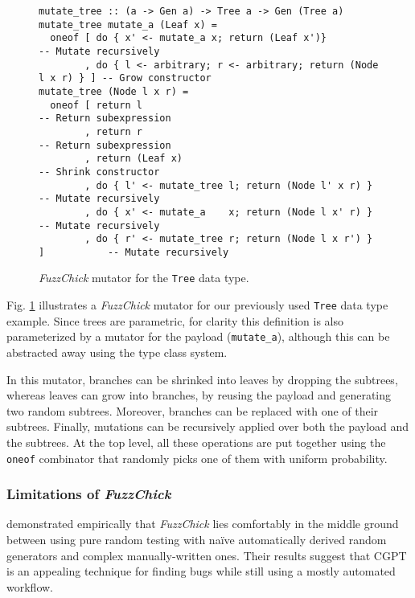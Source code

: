 \documentclass[acmsmall, anonymous]{acmart}
\newcommand{\fuzzchick}{\textit{FuzzChick}\xspace}
\begin{document}
\begin{figure}
\begin{verbatim}
mutate_tree :: (a -> Gen a) -> Tree a -> Gen (Tree a)
mutate_tree mutate_a (Leaf x) =
  oneof [ do { x' <- mutate_a x; return (Leaf x')}                     -- Mutate recursively
        , do { l <- arbitrary; r <- arbitrary; return (Node l x r) } ] -- Grow constructor
mutate_tree (Node l x r) =
  oneof [ return l                                                     -- Return subexpression
        , return r                                                     -- Return subexpression
        , return (Leaf x)                                              -- Shrink constructor
        , do { l' <- mutate_tree l; return (Node l' x r) }             -- Mutate recursively
        , do { x' <- mutate_a    x; return (Node l x' r) }             -- Mutate recursively
        , do { r' <- mutate_tree r; return (Node l x r') } ]           -- Mutate recursively
\end{verbatim}
\caption{\label{fig:fuzzchick:mutator}\fuzzchick mutator for the \texttt{Tree} data type. }
\end{figure}

Fig. \ref{fig:fuzzchick:mutator} illustrates a \fuzzchick mutator for our
previously used \texttt{Tree} data type example.
%
Since trees are parametric, for clarity this definition is also parameterized by
a mutator for the payload (\texttt{mutate\_a}), although this can be abstracted
away using the type class system.



In this mutator, branches can be shrinked into leaves by dropping the subtrees,
whereas leaves can grow into branches, by reusing the payload and generating two
random subtrees.
%
Moreover, branches can be replaced with one of their subtrees.
%
Finally, mutations can be recursively applied over both the payload and the
subtrees.
%
At the top level, all these operations are put together using the \texttt{oneof}
combinator that randomly picks one of them with uniform probability.

%
%
\subsubsection{Limitations of \fuzzchick}

\citeauthor{lampropoulos2019coverage} demonstrated empirically that \fuzzchick
lies comfortably in the middle ground between using pure random testing with
na\"ive automatically derived random generators and complex manually-written
ones.
%
Their results suggest that CGPT is an appealing technique for finding bugs while
still using a mostly automated workflow.
\end{document}
